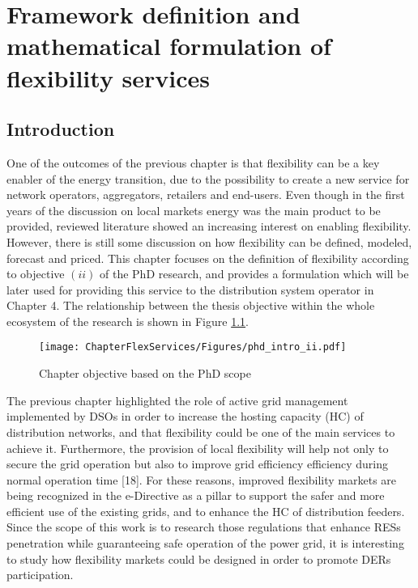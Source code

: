 \chapter{Framework definition and mathematical formulation of flexibility services}
\label{chapterFlexibility}

\section{Introduction}
One of the outcomes of the previous chapter is that flexibility can be a key enabler of the energy transition, due to the possibility to create a new service for network operators, aggregators, retailers and end-users. Even though in the first years of the discussion on local markets energy was the main product to be provided, reviewed literature showed an increasing interest on enabling flexibility. However, there is still some discussion on how flexibility can be defined, modeled, forecast and priced. This chapter focuses on the definition of flexibility according to objective $(ii)$ of the PhD research, and provides a formulation which will be later used for providing this service to the distribution system operator in Chapter 4. The relationship between the thesis objective within the whole ecosystem of the research is shown in Figure \ref{fig:chapter_obj_ii}.


\begin{figure}[htbp]
	\centering
	\texttt{[image: ChapterFlexServices/Figures/phd\_intro\_ii.pdf]}
		\caption{Chapter objective based on the PhD scope}
	\label{fig:chapter_obj_ii}  
\end{figure}

The previous chapter highlighted the role of active grid management implemented by DSOs in order to increase the hosting capacity (HC) of distribution networks, and that flexibility could be one of the main services to achieve it. Furthermore, the provision of local flexibility will help not only to secure the grid operation but also to improve grid efficiency efficiency during normal operation time [18]. For these reasons, improved flexibility markets are being recognized in the e-Directive as a pillar to support the safer and more efficient use of the existing grids, and to enhance the HC of distribution feeders. Since the scope of this work is to research those regulations that enhance RESs penetration while guaranteeing safe operation of the power grid, it is interesting to study how flexibility markets could be designed in order to promote DERs participation.

